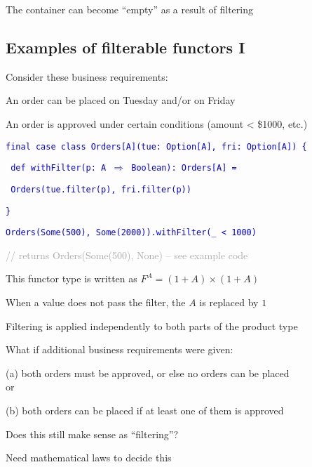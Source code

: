 The container can become ``empty'' as a result of filtering


\subsection{Examples of filterable functors I}

Consider these business requirements:

An order can be placed on Tuesday and/or on Friday

An order is approved under certain conditions (amount < \$1000, etc.)

\texttt{\textcolor{blue}{\footnotesize{}final case class Orders{[}A{]}(tue: Option{[}A{]},
fri: Option{[}A{]}) \{}}{\footnotesize\par}

\texttt{\textcolor{blue}{\footnotesize{}  def withFilter(p: A $\Rightarrow$
Boolean): Orders{[}A{]} = }}{\footnotesize\par}

\texttt{\textcolor{blue}{\footnotesize{}    Orders(tue.filter(p),
fri.filter(p))}}{\footnotesize\par}

\texttt{\textcolor{blue}{\footnotesize{}\}}}{\footnotesize\par}

\texttt{\textcolor{blue}{\footnotesize{}Orders(Some(500), Some(2000)).withFilter(\_
< 1000)}}{\footnotesize\par}

\textcolor{darkgray}{\footnotesize{}// returns Orders(Some(500), None)
– see example code}{\footnotesize\par}

This functor type is written as $F^{A}=(1+A)\times(1+A)$

When a value does not pass the filter, the $A$ is replaced by $1$

Filtering is applied independently to both parts of the product type

What if additional business requirements were given:

(a) both orders must be approved, or else no orders can be placed\\
or

(b) both orders can be placed if at least one of them is approved

Does this still make sense as ``filtering''?

Need mathematical laws to decide this


